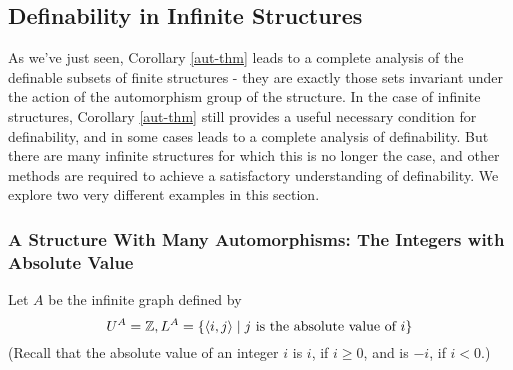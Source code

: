 \subsection*{Definability in Infinite Structures}

As we've just seen, Corollary \ref{aut-thm} leads to a complete analysis of the definable subsets of finite structures - they are exactly those sets invariant under the action of the automorphism group of the structure. In the case of infinite structures, Corollary \ref{aut-thm} still provides a useful necessary condition for definability, and in some cases leads to a complete analysis of definability. But there are many infinite structures for which this is no longer the case, and other methods are required to achieve a satisfactory understanding of definability. We explore two very different examples in this section.

\subsubsection*{A Structure With Many Automorphisms: The Integers with Absolute Value}
Let $A$ be the infinite graph defined by
\[
    U^A = \mathbb{Z}, L^A = \{\mbox{$\langle i,j \rangle$}\mid j \mbox{ is the absolute value of } i\}
\]
(Recall that the absolute value of an integer $i$ is $i$, if $i\geq 0$, and is $-i$, if $i< 0$.) 

